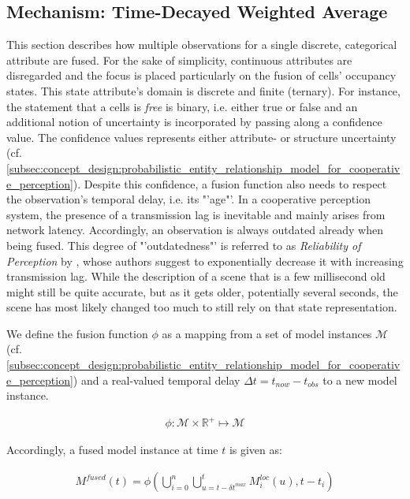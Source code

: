 \subsection{Mechanism: Time-Decayed Weighted Average}
\label{subsec:concept_design:fusion_mechanism}
This section describes how multiple observations for a single discrete, categorical attribute are fused. For the sake of simplicity, continuous attributes are disregarded and the focus is placed particularly on the fusion of cells' occupancy states. This state attribute's domain is discrete and finite (ternary). For instance, the statement that a cells is \textit{free} is binary, i.e. either true or false and an additional notion of uncertainty is incorporated by passing along a confidence value. The confidence values represents either attribute- or structure uncertainty (cf. \autoref{subsec:concept_design:probabilistic_entity_relationship_model_for_cooperative_perception}).
Despite this confidence, a fusion function also needs to respect the observation's temporal delay, i.e. its "'age"'. In a cooperative perception system, the presence of a transmission lag is inevitable and mainly arises from network latency. Accordingly, an observation is always outdated already when being fused. This degree of "'outdatedness"' is referred to as \textit{Reliability of Perception} by \cite{liu2013motion}, whose authors suggest to exponentially decrease it with increasing transmission lag. While the description of a scene that is a few millisecond old might still be quite accurate, but as it gets older, potentially several seconds, the scene has most likely changed too much to still rely on that state representation. 

We define the fusion function $\phi$ as a mapping from a set of model instances $\mathcal{M}$ (cf. \autoref{subsec:concept_design:probabilistic_entity_relationship_model_for_cooperative_perception}) and a real-valued temporal delay $\Delta t = t_{now} - t_{obs}$ to a new model instance.

\begin{gather}
	\phi: \mathcal{M} \times \mathbb{R}^+ \mapsto \mathcal{M}
\end{gather}

Accordingly, a fused model instance at time $t$ is given as:

\begin{gather}
	M^{fused}(t) = \phi(\bigcup^n_{i = 0} \bigcup^t_{u = t - \delta t^{max}} M^{loc}_i(u), t-t_i)
\end{gather}

